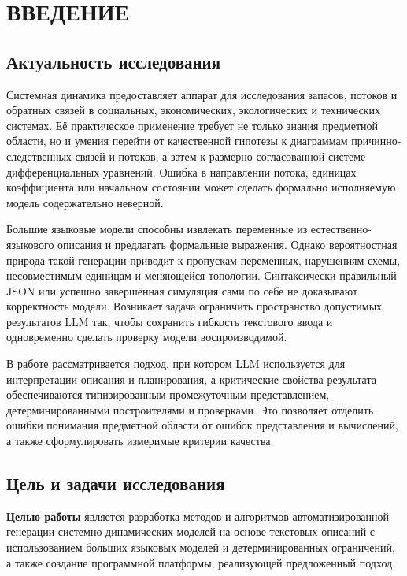 \chapter*{ВВЕДЕНИЕ}

\section*{Актуальность исследования}

Системная динамика предоставляет аппарат для исследования запасов, потоков и обратных связей в социальных, экономических, экологических и технических системах. Её практическое применение требует не только знания предметной области, но и умения перейти от качественной гипотезы к диаграммам причинно-следственных связей и потоков, а затем к размерно согласованной системе дифференциальных уравнений. Ошибка в направлении потока, единицах коэффициента или начальном состоянии может сделать формально исполняемую модель содержательно неверной.

Большие языковые модели способны извлекать переменные из естественно-языкового описания и предлагать формальные выражения. Однако вероятностная природа такой генерации приводит к пропускам переменных, нарушениям схемы, несовместимым единицам и меняющейся топологии. Синтаксически правильный JSON или успешно завершённая симуляция сами по себе не доказывают корректность модели. Возникает задача ограничить пространство допустимых результатов LLM так, чтобы сохранить гибкость текстового ввода и одновременно сделать проверку модели воспроизводимой.

В работе рассматривается подход, при котором LLM используется для интерпретации описания и планирования, а критические свойства результата обеспечиваются типизированным промежуточным представлением, детерминированными построителями и проверками. Это позволяет отделить ошибки понимания предметной области от ошибок представления и вычислений, а также сформулировать измеримые критерии качества.

\section*{Цель и задачи исследования}

\textbf{Целью работы} является разработка методов и алгоритмов автоматизированной генерации системно-динамических моделей на основе текстовых описаний с использованием больших языковых моделей и детерминированных ограничений, а также создание программной платформы, реализующей предложенный подход.

